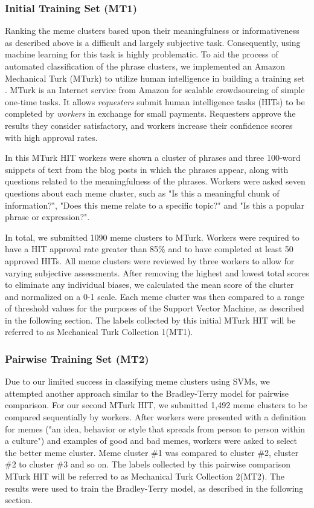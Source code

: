 \documentclass{sig-alternate}
\begin{document}
\subsubsection{Initial Training Set (MT1)}
Ranking the meme clusters based upon their meaningfulness or informativeness as described above is a difficult and largely subjective task. Consequently, using machine learning for this task is highly problematic. To aid the process of automated classification of the phrase clusters, we implemented an Amazon Mechanical Turk (MTurk) to utilize human intelligence in building a training set \cite{Barr2006}. MTurk is an Internet service from Amazon for scalable crowdsourcing of simple one-time tasks. It allows \emph{requesters} submit human intelligence tasks (HITs) to be completed by \emph{workers} in exchange for small payments. Requesters approve the results they consider satisfactory, and workers increase their confidence scores with high approval rates.

In this MTurk HIT workers were shown a cluster of phrases and three 100-word snippets of text from the blog posts in which the phrases appear, along with questions related to the meaningfulness of the phrases. Workers were asked seven questions about each meme cluster, such as "Is this a meaningful chunk of information?", "Does this meme relate to a specific topic?" and "Is this a popular phrase or expression?".

In total, we submitted 1090 meme clusters to MTurk. Workers were required to have a HIT approval rate greater than 85\% and to have completed at least 50 approved HITs. All meme clusters were reviewed by three workers to allow for varying subjective assessments. After removing the highest and lowest total scores to eliminate any individual biases, we calculated the mean score of the cluster and normalized on a 0-1 scale. Each meme cluster was then compared to a range of threshold values for the purposes of the Support Vector Machine, as described in the following section. The labels collected by this initial MTurk HIT will be referred to as Mechanical Turk Collection 1(MT1).

\subsubsection{Pairwise Training Set (MT2)}
Due to our limited success in classifying meme clusters using SVMs, we attempted another approach similar to the Bradley-Terry model \cite{Bradley1952} for pairwise comparison. For our second MTurk HIT, we submitted 1,492 meme clusters to be compared sequentially by workers. After workers were presented with a definition for memes ("an idea, behavior or style that spreads from person to person within a culture") and examples of good and bad memes, workers were asked to select the better meme cluster. Meme cluster \#1 was compared to cluster \#2, cluster \#2 to cluster \#3 and so on. The labels collected by this pairwise comparison MTurk HIT will be referred to as Mechanical Turk Collection 2(MT2). The results were used to train the Bradley-Terry model, as described in the following section.
\end{document}

